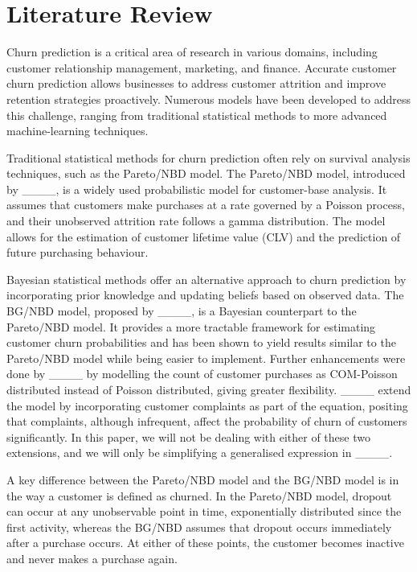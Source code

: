 \section{Literature Review}
Churn prediction is a critical area of research in various domains, including customer relationship management, marketing, and finance. Accurate customer churn prediction allows businesses to address customer attrition and improve retention strategies proactively. Numerous models have been developed to address this challenge, ranging from traditional statistical methods to more advanced machine-learning techniques.

Traditional statistical methods for churn prediction often rely on survival analysis techniques, such as the Pareto/NBD model. The Pareto/NBD model, introduced by ____, is a widely used probabilistic model for customer-base analysis. It assumes that customers make purchases at a rate governed by a Poisson process, and their unobserved attrition rate follows a gamma distribution. The model allows for the estimation of customer lifetime value (CLV) and the prediction of future purchasing behaviour.

Bayesian statistical methods offer an alternative approach to churn prediction by incorporating prior knowledge and updating beliefs based on observed data. The BG/NBD model, proposed by ____, is a Bayesian counterpart to the Pareto/NBD model. It provides a more tractable framework for estimating customer churn probabilities and has been shown to yield results similar to the Pareto/NBD model while being easier to implement. Further enhancements were done by ____ by modelling the count of customer purchases as COM-Poisson distributed instead of Poisson distributed, giving greater flexibility. ____ extend the model by incorporating customer complaints as part of the equation, positing that complaints, although infrequent, affect the probability of churn of customers significantly. In this paper, we will not be dealing with either of these two extensions, and we will only be simplifying a generalised expression in ____.

A key difference between the Pareto/NBD model and the BG/NBD model is in the way a customer is defined as churned. In the Pareto/NBD model, dropout can occur at any unobservable point in time, exponentially distributed since the first activity, whereas the BG/NBD assumes that dropout occurs immediately after a purchase occurs. At either of these points, the customer becomes inactive and never makes a purchase again.

